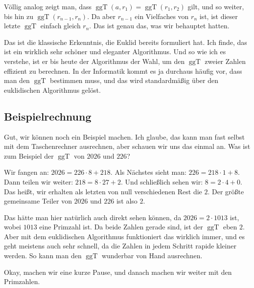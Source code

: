 \begin{spoken-clean}[00:39:09 - 00:40:39]
Völlig analog zeigt man, dass $\operatorname{ggT}(a, r_1) = \operatorname{ggT}(r_1, r_2)$ gilt, und so weiter, bis hin zu $\operatorname{ggT}(r_{n-1}, r_n)$. Da aber $r_{n-1}$ ein Vielfaches von $r_n$ ist, ist dieser letzte $\operatorname{ggT}$ einfach gleich $r_n$. Das ist genau das, was wir behauptet hatten.

Das ist die klassische Erkenntnis, die Euklid bereits formuliert hat. Ich finde, das ist ein wirklich sehr schöner und eleganter Algorithmus. Und so wie ich es verstehe, ist er bis heute der Algorithmus der Wahl, um den $\operatorname{ggT}$ zweier Zahlen effizient zu berechnen. In der Informatik kommt es ja durchaus häufig vor, dass man den $\operatorname{ggT}$ bestimmen muss, und das wird standardmäßig über den euklidischen Algorithmus gelöst.
\end{spoken-clean}

\subsection{Beispielrechnung}

\begin{spoken-clean}[00:40:39 - 00:42:04]
Gut, wir können noch ein Beispiel machen. Ich glaube, das kann man fast selbst mit dem Taschenrechner ausrechnen, aber schauen wir uns das einmal an. Was ist zum Beispiel der $\operatorname{ggT}$ von $2026$ und $226$?

Wir fangen an: $2026 = 226 \cdot 8 + 218$. Als Nächstes sieht man: $226 = 218 \cdot 1 + 8$. Dann teilen wir weiter: $218 = 8 \cdot 27 + 2$. Und schließlich sehen wir: $8 = 2 \cdot 4 + 0$. Das heißt, wir erhalten als letzten von null verschiedenen Rest die $2$. Der größte gemeinsame Teiler von $2026$ und $226$ ist also $2$.

Das hätte man hier natürlich auch direkt sehen können, da $2026 = 2 \cdot 1013$ ist, wobei $1013$ eine Primzahl ist. Da beide Zahlen gerade sind, ist der $\operatorname{ggT}$ eben $2$. Aber mit dem euklidischen Algorithmus funktioniert das wirklich immer, und es geht meistens auch sehr schnell, da die Zahlen in jedem Schritt rapide kleiner werden. So kann man den $\operatorname{ggT}$ wunderbar von Hand ausrechnen.
\end{spoken-clean}

\begin{spoken-clean}[00:42:04 - 00:42:54]
Okay, machen wir eine kurze Pause, und danach machen wir weiter mit den Primzahlen.
\end{spoken-clean}

